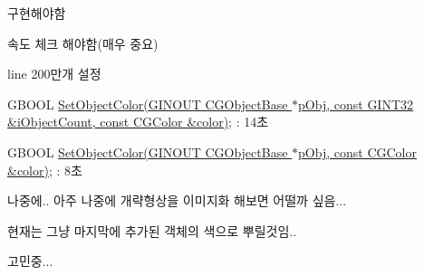 \begin{DoxyRefList}
\begin{DoxyItemize}
\item 구현해야함  
\end{DoxyItemize}
\item[\label{todo__todo000012}%
\hypertarget{todo__todo000012}{}%
Member \hyperlink{class_c_g_property_manager_aaad652565644997a952bb6851f2081e8}{C\+G\+Property\+Manager\+:\+:Set\+Object\+Color} (G\+I\+N\+O\+U\+T \hyperlink{class_c_g_object_base}{C\+G\+Object\+Base} $\ast$p\+Obj, const G\+I\+N\+T32 \&i\+Object\+Count, const \hyperlink{class_c_g_color}{C\+G\+Color} \&color)]
\begin{DoxyItemize}
\item 속도 체크 해야함(매우 중요)
\begin{DoxyItemize}
\item line 200만개 설정
\begin{DoxyItemize}
\item G\+B\+O\+O\+L \hyperlink{class_c_g_property_manager_aaad652565644997a952bb6851f2081e8}{Set\+Object\+Color(\+G\+I\+N\+O\+U\+T C\+G\+Object\+Base $\ast$p\+Obj, const G\+I\+N\+T32 \&i\+Object\+Count, const C\+G\+Color \&color)}; \+: 14초
\item G\+B\+O\+O\+L \hyperlink{class_c_g_property_manager_afa7aa3e26844505204a156aace6d209d}{Set\+Object\+Color(\+G\+I\+N\+O\+U\+T C\+G\+Object\+Base $\ast$p\+Obj, const C\+G\+Color \&color)}; \+: 8초  
\end{DoxyItemize}
\end{DoxyItemize}
\end{DoxyItemize}
\item[\label{todo__todo000004}%
\hypertarget{todo__todo000004}{}%
Member \hyperlink{class_c_g_space_a4041d193b8f5f02ab925d35022d49395}{C\+G\+Space\+:\+:Update\+Simple\+Shape} (const \hyperlink{class_c_g_object_base}{C\+G\+Object\+Base} \&object)]
\begin{DoxyItemize}
\item 나중에.. 아주 나중에 개략형상을 이미지화 해보면 어떨까 싶음...
\item 현재는 그냥 마지막에 추가된 객체의 색으로 뿌릴것임..  
\end{DoxyItemize}
\item[\label{todo__todo000008}%
\hypertarget{todo__todo000008}{}%
Member \hyperlink{class_c_g_space_manager_a71d9200f1ec5166b5ffbe603e9cac2a0}{C\+G\+Space\+Manager\+:\+:Create\+Optimized\+Space\+For\+O\+Bject} (const \hyperlink{class_c_g_object_base}{C\+G\+Object\+Base} \&object)]
\begin{DoxyItemize}
\item 고민중...

\end{DoxyItemize}
\end{DoxyRefList}
